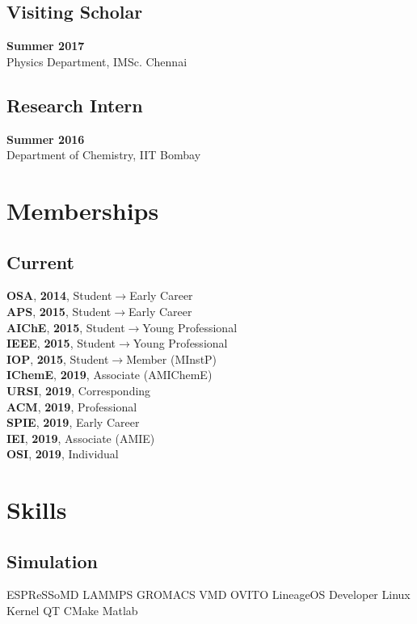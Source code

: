 \documentclass[letterpaper]{deedy-resume} %
\begin{document}
\begin{minipage}[t]{0.36\textwidth}
	\subsection{Visiting Scholar}
	\textbf{Summer 2017}\\ Physics Department, IMSc. Chennai
	\subsection{Research Intern}
	\textbf{Summer 2016}\\ Department of Chemistry, IIT Bombay


	\vspace{-5pt}
	\section{Memberships}
	\subsection{Current}
	\textbf{OSA}, \textbf{2014}, Student$\to$Early Career\\
	\textbf{APS}, \textbf{2015}, Student$\to$Early Career\\
	\textbf{AIChE}, \textbf{2015}, Student$\to$Young Professional\\
	\textbf{IEEE}, \textbf{2015}, Student$\to$Young Professional\\
	\textbf{IOP}, \textbf{2015}, Student$\to$Member (MInstP)\\
	\textbf{IChemE}, \textbf{2019}, Associate (AMIChemE)\\
	\textbf{URSI}, \textbf{2019}, Corresponding \\
	\textbf{ACM}, \textbf{2019}, Professional \\
	\textbf{SPIE}, \textbf{2019}, Early Career \\
	\textbf{IEI}, \textbf{2019}, Associate (AMIE) \\
	\textbf{OSI}, \textbf{2019}, Individual
	\vspace{-5pt}



	\section{Skills}
	\subsection{Simulation}
	ESPReSSoMD \textbullet{} LAMMPS \textbullet{} GROMACS \textbullet{} VMD \textbullet{} OVITO\textbullet{} LineageOS Developer\textbullet{} Linux Kernel\textbullet{} QT\textbullet{} CMake\textbullet{} Matlab\\

\end{minipage}
\end{document}
